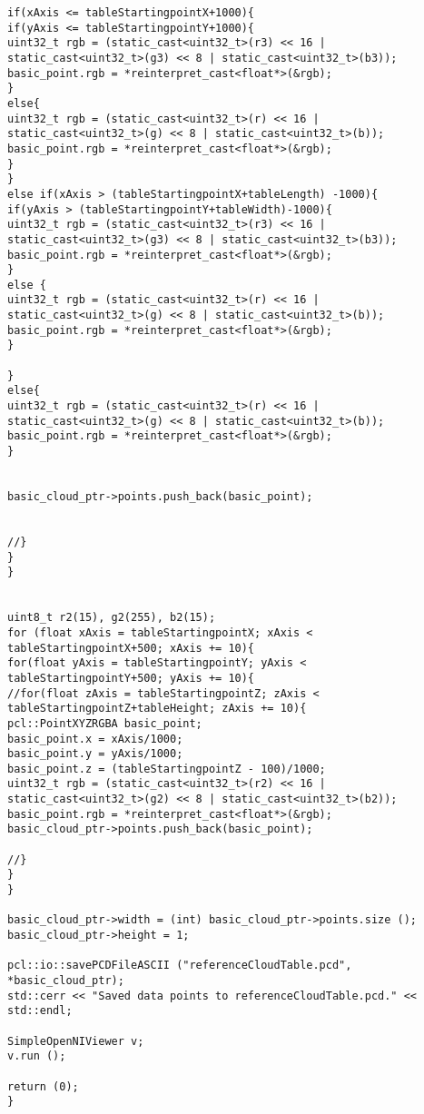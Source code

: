 \begin{lstlisting}[frame = single, label={lst:cppread1}]
if(xAxis <= tableStartingpointX+1000){
if(yAxis <= tableStartingpointY+1000){
uint32_t rgb = (static_cast<uint32_t>(r3) << 16 |
static_cast<uint32_t>(g3) << 8 | static_cast<uint32_t>(b3));
basic_point.rgb = *reinterpret_cast<float*>(&rgb);
}
else{
uint32_t rgb = (static_cast<uint32_t>(r) << 16 |
static_cast<uint32_t>(g) << 8 | static_cast<uint32_t>(b));
basic_point.rgb = *reinterpret_cast<float*>(&rgb);
}
}
else if(xAxis > (tableStartingpointX+tableLength) -1000){
if(yAxis > (tableStartingpointY+tableWidth)-1000){
uint32_t rgb = (static_cast<uint32_t>(r3) << 16 |
static_cast<uint32_t>(g3) << 8 | static_cast<uint32_t>(b3));
basic_point.rgb = *reinterpret_cast<float*>(&rgb);
}
else {
uint32_t rgb = (static_cast<uint32_t>(r) << 16 |
static_cast<uint32_t>(g) << 8 | static_cast<uint32_t>(b));
basic_point.rgb = *reinterpret_cast<float*>(&rgb);
}

}
else{
uint32_t rgb = (static_cast<uint32_t>(r) << 16 |
static_cast<uint32_t>(g) << 8 | static_cast<uint32_t>(b));
basic_point.rgb = *reinterpret_cast<float*>(&rgb);
}


basic_cloud_ptr->points.push_back(basic_point);


//}
}
}


uint8_t r2(15), g2(255), b2(15);
for (float xAxis = tableStartingpointX; xAxis < tableStartingpointX+500; xAxis += 10){
for(float yAxis = tableStartingpointY; yAxis < tableStartingpointY+500; yAxis += 10){
//for(float zAxis = tableStartingpointZ; zAxis < tableStartingpointZ+tableHeight; zAxis += 10){
pcl::PointXYZRGBA basic_point;
basic_point.x = xAxis/1000;
basic_point.y = yAxis/1000;
basic_point.z = (tableStartingpointZ - 100)/1000;
uint32_t rgb = (static_cast<uint32_t>(r2) << 16 |
static_cast<uint32_t>(g2) << 8 | static_cast<uint32_t>(b2));
basic_point.rgb = *reinterpret_cast<float*>(&rgb);
basic_cloud_ptr->points.push_back(basic_point);

//}
}
}

basic_cloud_ptr->width = (int) basic_cloud_ptr->points.size ();
basic_cloud_ptr->height = 1;

pcl::io::savePCDFileASCII ("referenceCloudTable.pcd", *basic_cloud_ptr);
std::cerr << "Saved data points to referenceCloudTable.pcd." << std::endl;

SimpleOpenNIViewer v;
v.run ();

return (0);
}

\end{lstlisting}
